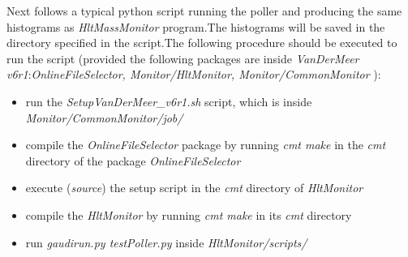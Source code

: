 Next follows a typical python script running the poller and producing the same histograms as \textit{HltMassMonitor} program.The histograms will be saved in the directory specified in the script.The following procedure should be executed to run the script (provided the following packages are inside \textit{VanDerMeer v6r1}:\textit{OnlineFileSelector, Monitor/HltMonitor, Monitor/CommonMonitor} ):
\begin{itemize}
\item run the \textit{SetupVanDerMeer\_v6r1.sh} script, which is inside \textit{Monitor/CommonMonitor/job/}
\item compile the \textit{OnlineFileSelector} package by running \textit{cmt make} in the \textit{cmt} directory of the package \textit{OnlineFileSelector}
\item execute (\textit{source}) the setup script in the \textit{cmt} directory of \textit{HltMonitor}
\item compile the \textit{HltMonitor} by running \textit{cmt make} in its \textit{cmt} directory
\item run \textit{gaudirun.py testPoller.py} inside \textit{HltMonitor/scripts/}

\end{itemize}

